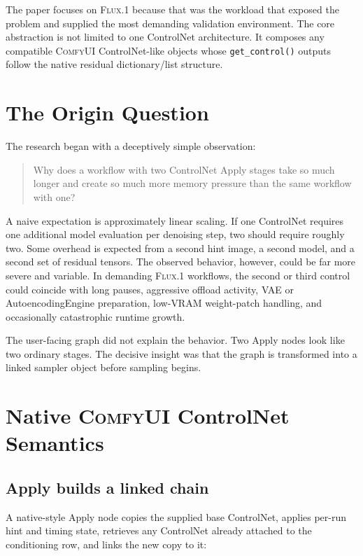 \documentclass[11pt]{article}
\newcommand{\FluxOne}{\textsc{Flux.1}}
\newcommand{\ComfyUI}{\textsc{ComfyUI}}
\newcommand{\code}[1]{\texttt{#1}}
\begin{document}
The paper focuses on \FluxOne{} because that was the workload that exposed the problem and supplied the most demanding validation environment. The core abstraction is not limited to one ControlNet architecture. It composes any compatible \ComfyUI{} ControlNet-like objects whose \code{get\_control()} outputs follow the native residual dictionary/list structure.

\section{The Origin Question}

The research began with a deceptively simple observation:

\begin{quote}
Why does a workflow with two ControlNet Apply stages take so much longer and create so much more memory pressure than the same workflow with one?
\end{quote}

A naive expectation is approximately linear scaling. If one ControlNet requires one additional model evaluation per denoising step, two should require roughly two. Some overhead is expected from a second hint image, a second model, and a second set of residual tensors. The observed behavior, however, could be far more severe and variable. In demanding \FluxOne{} workflows, the second or third control could coincide with long pauses, aggressive offload activity, VAE or AutoencodingEngine preparation, low-VRAM weight-patch handling, and occasionally catastrophic runtime growth.

The user-facing graph did not explain the behavior. Two Apply nodes look like two ordinary stages. The decisive insight was that the graph is transformed into a linked sampler object before sampling begins.

\section{Native \ComfyUI{} ControlNet Semantics}

\subsection{Apply builds a linked chain}

A native-style Apply node copies the supplied base ControlNet, applies per-run hint and timing state, retrieves any ControlNet already attached to the conditioning row, and links the new copy to it:
\end{document}
